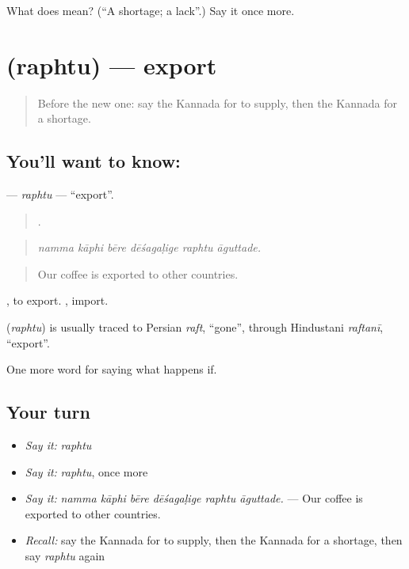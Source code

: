 \begin{tcolorbox}[breakable,colback=teal!4,colframe=teal!35!black,title={Before you move on}]
What does  mean? (\textquotedblleft{}A shortage; a lack\textquotedblright{}.) Say it once more.
\end{tcolorbox}
\section[\texorpdfstring{\kn{ರಫ್ತು} (raphtu)}{ರಫ್ತು (raphtu)}]{ (raphtu) — export}

\label{lesson:KA-C421-raphtu}



\begin{quote}
Before the new one: say the Kannada for to supply, then the Kannada for a shortage.
\end{quote}

\subsection*{You'll want to know: }
\textbf{} — \emph{raphtu} — \textquotedblleft{}export\textquotedblright{}.

\begin{quote}
     .
\end{quote}

\begin{quote}
\emph{namma kāphi bēre dēśagaḷige raphtu āguttade.}
\end{quote}

\begin{quote}
Our coffee is exported to other countries.
\end{quote}

 , to export. , import.

\begin{cousinweb}
\textbf{} (\emph{raphtu}) is usually traced to Persian \emph{raft}, \textquotedblleft{}gone\textquotedblright{}, through Hindustani \emph{raftanī}, \textquotedblleft{}export\textquotedblright{}.
\end{cousinweb}

\begin{grammarlens}[title={What you've built}]
One more word for saying what happens if.
\end{grammarlens}

\subsection*{Your turn}
\begin{itemize}
\raggedright
  \item \emph{Say it:} \emph{raphtu}
  \item \emph{Say it:} \emph{raphtu}, once more
  \item \emph{Say it:} \emph{namma kāphi bēre dēśagaḷige raphtu āguttade.} — Our coffee is exported to other countries.
  \item \emph{Recall:} say the Kannada for to supply, then the Kannada for a shortage, then say \emph{raphtu} again
\end{itemize}

